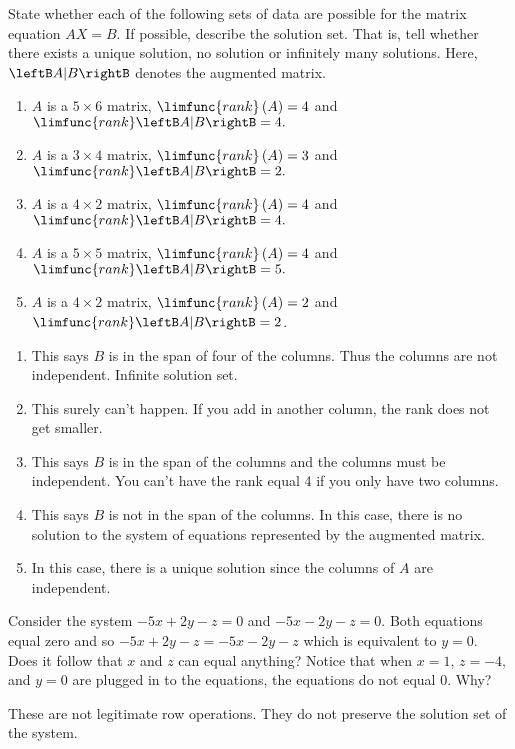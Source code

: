 \begin{enumialphparenastyle}
\begin{ex} State whether each of the following sets of data are possible for the
matrix equation $AX=B$. If possible, describe the solution set.
That is, tell whether there exists a unique solution, no solution or
infinitely many solutions. Here, $\leftB A |B \rightB$ denotes the augmented matrix.

\begin{enumerate}
\item $A$ is a $5\times 6$ matrix, $\limfunc{rank}\left( A\right) =4$ and 
$\limfunc{rank}\leftB A|B \rightB =4.$ 

\item $A$ is a $3\times 4$ matrix, $\limfunc{rank}\left( A\right) =3$ and 
$\limfunc{rank}\leftB A|B\rightB =2.$

\item $A$ is a $4\times 2$ matrix, $\limfunc{rank}\left( A\right) =4$ and 
$\limfunc{rank}\leftB A|B \rightB =4.$ 

\item $A$ is a $5\times 5$ matrix, $\limfunc{rank}\left( A\right) =4$ and 
$\limfunc{rank}\leftB A|B \rightB =5.$ 

\item $A$ is a $4\times 2$ matrix, $\limfunc{rank}\left( A\right) =2$ and 
$\limfunc{rank}\leftB A|B \rightB =2$.
\end{enumerate}

\begin{sol}
\begin{enumerate}
\item This says $B$ is in the span of four of the columns. Thus the columns are not independent. Infinite solution set.
\item This surely can't happen. If you add in another column, the rank does not get smaller.
\item This says $B$ is in the span of the columns and the columns must be
independent. You can't have the rank equal 4 if you only have two columns.
\item This says $B$ is not in the span of the columns. In this case, there is no solution to the system of equations represented by the augmented matrix.
\item In this case, there is a
unique solution since the columns of $A$ are independent.
\end{enumerate}
\end{sol}
\end{ex}

\begin{ex} Consider the system $-5x+2y-z=0$ and $-5x-2y-z=0.$ Both equations
equal zero and so $-5x+2y-z=-5x-2y-z$ which is equivalent to $y=0.$ Does it follow that $x$
and $z$ can equal anything?  Notice that when $x=1$, $z=-4,$ and $y=0$ are plugged in
to the equations, the equations do not equal $0$. Why?
\begin{sol}
These are not legitimate row
operations. They do not preserve the solution set of the system.
\end{sol}
\end{ex}

\end{enumialphparenastyle}